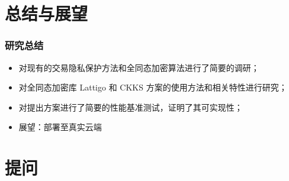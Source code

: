 \section{总结与展望}

\begin{frame}
    \frametitle{研究总结}

    \begin{itemize}
        \item 对现有的交易隐私保护方法和全同态加密算法进行了简要的调研；
        \item 对全同态加密库 Lattigo 和 CKKS 方案的使用方法和相关特性进行研究；
        \item 对提出方案进行了简要的性能基准测试，证明了其可实现性；
        \item 展望：部署至真实云端
    \end{itemize}

\end{frame}

\section*{提问}
